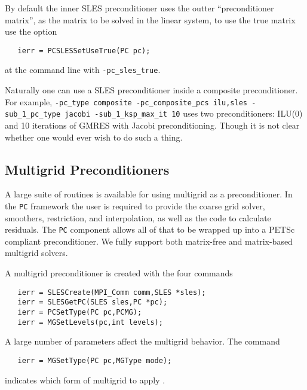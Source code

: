 By default the inner SLES preconditioner uses the outter ``preconditioner matrix'', 
as the matrix to be solved in the linear system, to use the true matrix use the 
option 
\begin{verbatim}
   ierr = PCSLESSetUseTrue(PC pc);
\end{verbatim}
at the command line with {\tt -pc\_sles\_true}. 

Naturally one can use a SLES preconditioner inside a composite preconditioner. For example,
{\tt -pc\_type composite -pc\_composite\_pcs ilu,sles -sub\_1\_pc\_type jacobi -sub\_1\_ksp\_max\_it 10}
uses two preconditioners: ILU(0) and 10 iterations of GMRES with Jacobi preconditioning. Though
it is not clear whether one would ever wish to do such a thing.

\subsection{Multigrid Preconditioners}  \label{sec:mg}

A large suite of routines is available for using multigrid as a
preconditioner. In the {\tt PC} framework the user is required to provide 
the coarse grid solver, smoothers, restriction, and interpolation, 
as well as the code to calculate residuals. The {\tt PC} component 
allows all of that to be wrapped up into a PETSc compliant preconditioner. 
We fully support both matrix-free and matrix-based multigrid solvers.

A multigrid preconditioner is created with the four commands 
\begin{verbatim}
   ierr = SLESCreate(MPI_Comm comm,SLES *sles);
   ierr = SLESGetPC(SLES sles,PC *pc);
   ierr = PCSetType(PC pc,PCMG);
   ierr = MGSetLevels(pc,int levels);
\end{verbatim}
A  
large number of parameters affect the multigrid behavior. The command
\begin{verbatim}
   ierr = MGSetType(PC pc,MGType mode); 
\end{verbatim}
indicates which form of multigrid to apply \cite{1sbg}. 
  

